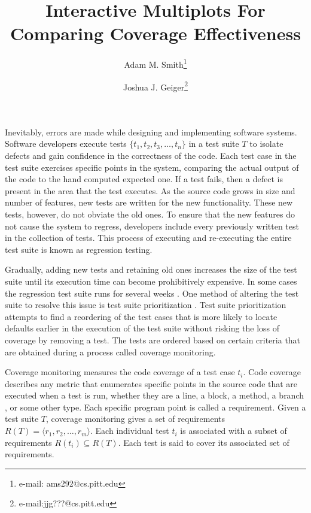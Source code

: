 \documentclass{vgtc}                          %
\title{Interactive Multiplots For Comparing Coverage Effectiveness}
\author{Adam M. Smith\thanks{e-mail: ams292@cs.pitt.edu} %
\and Joshua J. Geiger\thanks{e-mail:jjg???@cs.pitt.edu}} %
\affiliation{\scriptsize University of Pittsburgh}
\begin{document}


\maketitle


Inevitably, errors are made while designing and implementing software systems. Software developers execute tests $\{t_1, t_2, t_3,\ldots, t_n\}$ in a test suite $T$ to isolate defects and gain confidence in the correctness of the code.  Each test case in the test suite exercises specific points in the system, comparing the actual output of the code to the hand computed expected one.  If a test fails, then a defect is present in the area that the test executes.  As the source code grows in size and number of features, new tests are written for the new functionality.  These new tests, however, do not obviate the old ones.  To ensure that the new features do not cause the system to regress, developers include every previously written test in the collection of tests.  This process of executing and re-executing the entire test suite is known as regression testing.  

Gradually, adding new tests and retaining old ones increases the size of the test suite until its execution time can become prohibitively expensive.  In some cases the regression test suite runs for several weeks \cite{empiricalfamily}.  One method of altering the test suite to resolve this issue is test suite prioritization \cite{rothermelprioritizing2001}.  Test suite prioritization attempts to find a reordering of the test cases that is more likely to locate defaults earlier in the execution of the test suite without risking the loss of coverage by removing a test.  The tests are ordered based on certain criteria that are obtained during a process called coverage monitoring.  

Coverage monitoring measures the code coverage of a test case $t_i$.  Code coverage describes any metric that enumerates specific points in the source code that are executed when a test is run, whether they are a line, a block, a method, a branch \cite{zhu}, or some other type. Each specific program point is called a requirement.  Given a test suite $T$, coverage monitoring gives a set of requirements $R(T) = \langle r_1, r_2,\ldots,r_m \rangle$.  Each individual test $t_i$ is associated with a subset of requirements $R(t_i) \subseteq R(T)$.  Each test is said to cover its associated set of requirements.  
\end{document}
